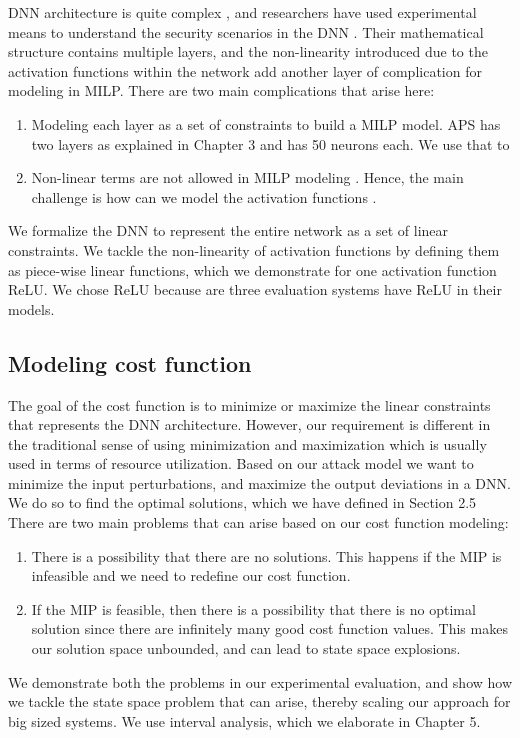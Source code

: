 DNN architecture is quite complex , and researchers have used experimental means to understand the security scenarios in the DNN . 
Their  mathematical structure contains multiple layers, and the non-linearity introduced due to the activation functions within the network add another layer of complication for modeling in \ac{MILP}.
There are two main complications that arise here:
\begin{enumerate}
	\item Modeling each layer as a set of constraints to build a \ac{MILP} model.
	\ac{APS} has two layers as explained in Chapter 3 and has 50 neurons each. 
	We use that to 
	\item Non-linear terms are not allowed in \ac{MILP} modeling . Hence, the main challenge is how can we model the activation functions . 
\end{enumerate}

We formalize the \ac{DNN} to represent the entire network as a set of linear constraints. 
We tackle the non-linearity of activation functions by defining them as piece-wise linear functions, 
which we demonstrate for one activation function ReLU.
We chose ReLU because are three evaluation systems  have ReLU in their models. 

\subsection{Modeling cost function}
The goal of the cost function is to minimize or maximize the linear constraints that represents the \ac{DNN} architecture. 
However, our requirement is different in the traditional sense of using minimization and maximization which is usually used in terms of resource utilization.  
Based on our attack model we want to minimize the input perturbations, and maximize the output deviations in a \ac{DNN}.
We do so to find the optimal solutions, which we have defined in Section 2.5
There are two main problems that can arise based on our cost function modeling:
\begin{enumerate}
	\item There is a possibility that there are no solutions. 
	This happens if the \ac{MIP} is infeasible and we need to redefine our cost function. 
	\item If the \ac{MIP} is feasible, then there is a possibility that there is no optimal solution since there are infinitely many good cost function values. 
	This makes our solution space unbounded, and can lead to state space explosions. 
\end{enumerate}

We demonstrate both the problems in our experimental evaluation, 
and show how we tackle the state space problem that can arise, thereby scaling our approach for big sized systems. 
We use interval analysis, which we elaborate in Chapter 5. 



















